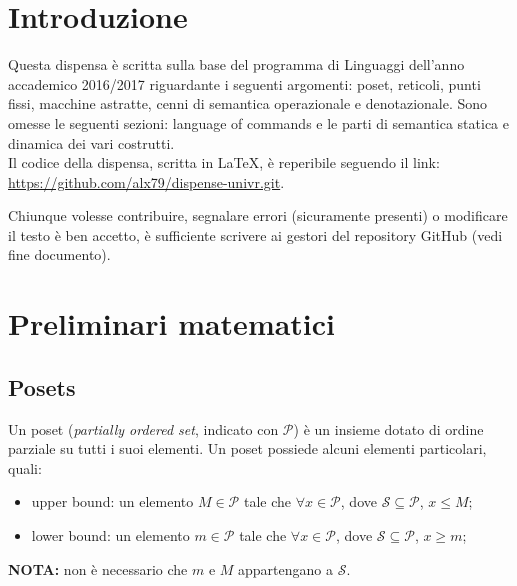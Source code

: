\documentclass[a4paper, 10pt]{article}
\begin{document}
	\begin{frontespizio}
		\Preambolo{\usepackage{datetime}}
	\end{frontespizio}
	
	\tableofcontents
	
	\newpage
	
	\section{Introduzione}
	
	Questa dispensa è scritta sulla base del programma di Linguaggi dell'anno accademico 2016/2017
	riguardante i seguenti argomenti: poset, reticoli, punti fissi, macchine astratte, cenni di semantica 
	operazionale e denotazionale. Sono omesse le seguenti sezioni: language of commands e le parti di semantica statica e dinamica dei vari costrutti. \\
	
	\noindent
	Il codice della dispensa, scritta in \LaTeX, è reperibile seguendo il link: \\ \url{https://github.com/alx79/dispense-univr.git}.
	
	Chiunque volesse contribuire, segnalare errori (sicuramente presenti) o modificare il testo è ben accetto, è sufficiente scrivere ai gestori del repository GitHub (vedi fine documento).
	
	\section{Preliminari matematici}
	\subsection{Posets}
	
	Un poset (\textit{partially ordered set}, indicato con $\mathcal{P}$) è un insieme dotato di ordine parziale su tutti i suoi elementi. Un poset possiede alcuni elementi particolari, quali:
	\begin{itemize}
		\item upper bound: un elemento $M \in \mathcal{P}$ tale che $\forall x \in \mathcal{P}$, dove  $\mathcal{S} \subseteq \mathcal{P}$, $x \leq M$;
		\item lower bound: un elemento $m \in \mathcal{P}$ tale che $\forall x \in \mathcal{P}$, dove  $\mathcal{S} \subseteq \mathcal{P}$, $x \geq m$;
	\end{itemize}
	\textbf{NOTA:} non è necessario che $m$ e $M$ appartengano a $\mathcal{S}$. \\
	
\end{document}
